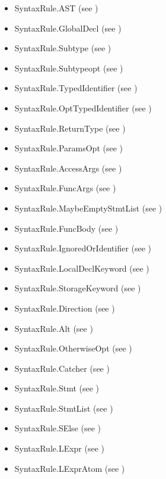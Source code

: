 \documentclass{book}
\begin{document}
\begin{itemize}
  \item SyntaxRule.AST (see )
  \item SyntaxRule.GlobalDecl (see )
  \item SyntaxRule.Subtype (see )
  \item SyntaxRule.Subtypeopt (see )
  \item SyntaxRule.TypedIdentifier (see )
  \item SyntaxRule.OptTypedIdentifier (see )
  \item SyntaxRule.ReturnType (see )
  \item SyntaxRule.ParamsOpt (see )
  \item SyntaxRule.AccessArgs (see )
  \item SyntaxRule.FuncArgs (see )
  \item SyntaxRule.MaybeEmptyStmtList (see )
  \item SyntaxRule.FuncBody (see )
  \item SyntaxRule.IgnoredOrIdentifier (see )
  \item SyntaxRule.LocalDeclKeyword (see )
  \item SyntaxRule.StorageKeyword (see )
  \item SyntaxRule.Direction (see )
  \item SyntaxRule.Alt (see )
  \item SyntaxRule.OtherwiseOpt (see )
  \item SyntaxRule.Catcher (see )
  \item SyntaxRule.Stmt (see )
  \item SyntaxRule.StmtList (see )
  \item SyntaxRule.SElse (see )
  \item SyntaxRule.LExpr (see )
  \item SyntaxRule.LExprAtom (see )

\end{itemize}
\end{document}

